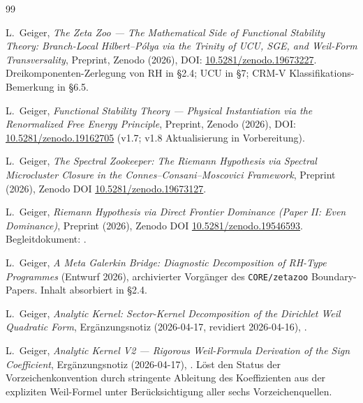 \documentclass[10pt,twocolumn]{article}
\theoremstyle{definition}
\theoremstyle{remark}
\begin{document}
\begin{thebibliography}{99}


L.~Geiger,
\textit{The Zeta Zoo --- The Mathematical Side of Functional
Stability Theory: Branch-Local Hilbert--P\'olya via the Trinity of
UCU, SGE, and Weil-Form Transversality},
Preprint, Zenodo (2026), DOI:
\href{https://doi.org/10.5281/zenodo.19673227}{10.5281/zenodo.19673227}.
Dreikomponenten-Zerlegung von $\mathrm{RH}$ in \S2.4; UCU in \S7;
CRM-V Klassifikations-Bemerkung in \S6.5.

L.~Geiger,
\textit{Functional Stability Theory --- Physical Instantiation via
the Renormalized Free Energy Principle},
Preprint, Zenodo (2026), DOI:
\href{https://doi.org/10.5281/zenodo.19162705}{10.5281/zenodo.19162705}
(v1.7; v1.8 Aktualisierung in Vorbereitung).

L.~Geiger,
\textit{The Spectral Zookeeper: The Riemann Hypothesis via Spectral
Microcluster Closure in the Connes--Consani--Moscovici Framework},
Preprint (2026), Zenodo DOI
\href{https://doi.org/10.5281/zenodo.19673127}{10.5281/zenodo.19673127}.


L.~Geiger,
\textit{Riemann Hypothesis via Direct Frontier Dominance (Paper II:
Even Dominance)},
Preprint (2026), Zenodo DOI \href{https://doi.org/10.5281/zenodo.19546593}{10.5281/zenodo.19546593}.
Begleitdokument: .

L.~Geiger,
\textit{A Meta Galerkin Bridge: Diagnostic Decomposition of RH-Type
Programmes}
(Entwurf 2026), archivierter Vorgänger des \texttt{CORE/zetazoo}
Boundary-Papers. Inhalt absorbiert in \cite{MathMaster} \S2.4.

L.~Geiger,
\textit{Analytic Kernel: Sector-Kernel Decomposition of the
Dirichlet Weil Quadratic Form},
Ergänzungsnotiz (2026-04-17, revidiert 2026-04-16),
.

L.~Geiger,
\textit{Analytic Kernel V2 --- Rigorous Weil-Formula Derivation
of the Sign Coefficient},
Ergänzungsnotiz (2026-04-17),
.
Löst den Status der Vorzeichenkonvention durch stringente Ableitung des
Koeffizienten aus der expliziten Weil-Formel unter Berücksichtigung aller sechs Vorzeichenquellen.


\end{thebibliography}
\end{document}
